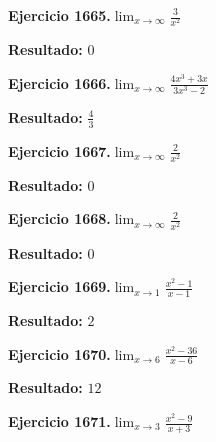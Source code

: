 \documentclass[10pt,a4paper]{article}
\begin{document}
\begin{ejbox}
\textbf{Ejercicio 1665.}\quad $\lim_{x\to \infty} \frac{3}{x^2}$
\end{ejbox}

\begin{solbox}
\textbf{Resultado:} \(\displaystyle 0\)
\end{solbox}

\newpage
\begin{ejbox}
\textbf{Ejercicio 1666.}\quad $\lim_{x\to \infty} \frac{4x^3 + 3x}{3x^3 - 2}$
\end{ejbox}

\begin{solbox}
\textbf{Resultado:} \(\displaystyle \frac{4}{3}\)
\end{solbox}

\begin{ejbox}
\textbf{Ejercicio 1667.}\quad $\lim_{x\to \infty} \frac{2}{x^2}$
\end{ejbox}

\begin{solbox}
\textbf{Resultado:} \(\displaystyle 0\)
\end{solbox}

\begin{ejbox}
\textbf{Ejercicio 1668.}\quad $\lim_{x\to \infty} \frac{2}{x^2}$
\end{ejbox}

\begin{solbox}
\textbf{Resultado:} \(\displaystyle 0\)
\end{solbox}

\newpage
\begin{ejbox}
\textbf{Ejercicio 1669.}\quad $\lim_{x\to 1} \frac{x^2-1}{x-1}$
\end{ejbox}

\begin{solbox}
\textbf{Resultado:} \(\displaystyle 2\)
\end{solbox}

\begin{ejbox}
\textbf{Ejercicio 1670.}\quad $\lim_{x\to 6} \frac{x^2-36}{x-6}$
\end{ejbox}

\begin{solbox}
\textbf{Resultado:} \(\displaystyle 12\)
\end{solbox}

\begin{ejbox}
\textbf{Ejercicio 1671.}\quad $\lim_{x\to 3} \frac{x^2-9}{x+3}$
\end{ejbox}
\end{document}
